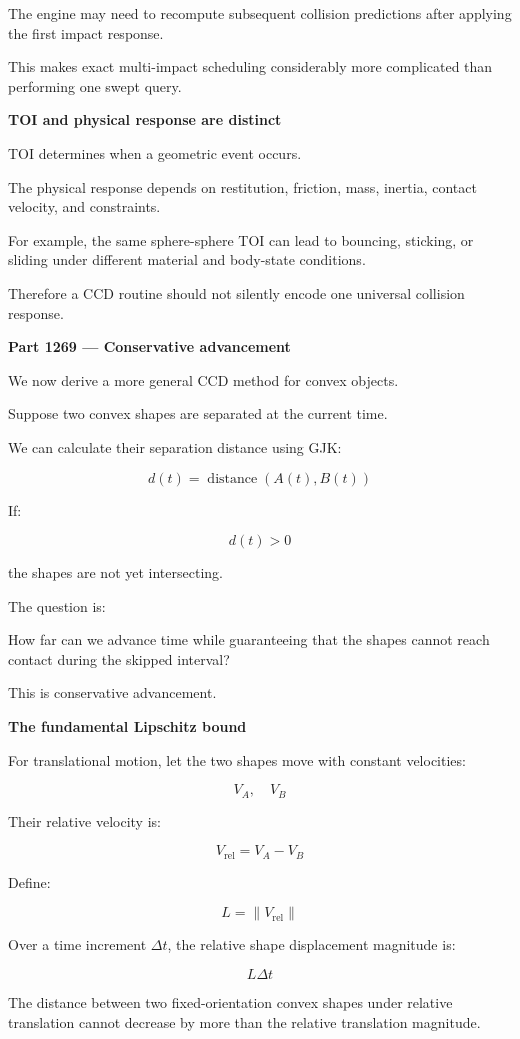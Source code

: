 The engine may need to recompute subsequent collision predictions after applying the first impact response.

This makes exact multi-impact scheduling considerably more complicated than performing one swept query.

\textbf{TOI and physical response are distinct}

TOI determines when a geometric event occurs.

The physical response depends on restitution, friction, mass, inertia, contact velocity, and constraints.

For example, the same sphere-sphere TOI can lead to bouncing, sticking, or sliding under different material and body-state conditions.

Therefore a CCD routine should not silently encode one universal collision response.

\textbf{Part 1269 --- Conservative advancement}

We now derive a more general CCD method for convex objects.

Suppose two convex shapes are separated at the current time.

We can calculate their separation distance using GJK:

\[
\boxed{ d(t)=\operatorname{distance}(A(t),B(t)) }
\]

If:

\[
d(t)>0
\]

the shapes are not yet intersecting.

The question is:

How far can we advance time while guaranteeing that the shapes cannot reach contact during the skipped interval?

This is conservative advancement.

\textbf{The fundamental Lipschitz bound}

For translational motion, let the two shapes move with constant velocities:

\[
V_A,\quad V_B
\]

Their relative velocity is:

\[
V_{\mathrm{rel}}=V_A-V_B
\]

Define:

\[
\boxed{ L=\|V_{\mathrm{rel}}\| }
\]

Over a time increment \(\Delta t\), the relative shape displacement magnitude is:

\[
L\Delta t
\]

The distance between two fixed-orientation convex shapes under relative translation cannot decrease by more than the relative translation magnitude.


